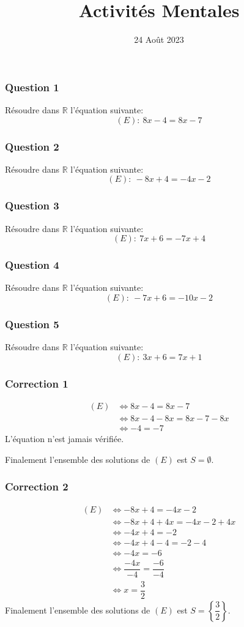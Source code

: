 \documentclass[15pt, mathserif]{beamer}
\title{Activités Mentales}
\date{24 Août 2023}
\begin{document}
\begin{frame}
    \titlepage
\end{frame}

\begin{frame} 
	\frametitle{Question 1}
	Résoudre dans $\mathbb{R}$ l'équation suivante: \[(E):~ 8x-4=8x-7\]\end{frame}


\begin{frame} 
	\frametitle{Question 2}
	Résoudre dans $\mathbb{R}$ l'équation suivante: \[(E):~ -8x+4=-4x-2\]\end{frame}


\begin{frame} 
	\frametitle{Question 3}
	Résoudre dans $\mathbb{R}$ l'équation suivante: \[(E):~ 7x+6=-7x+4\]\end{frame}


\begin{frame} 
	\frametitle{Question 4}
	Résoudre dans $\mathbb{R}$ l'équation suivante: \[(E):~ -7x+6=-10x-2\]\end{frame}


\begin{frame} 
	\frametitle{Question 5}
	Résoudre dans $\mathbb{R}$ l'équation suivante: \[(E):~ 3x+6=7x+1\]\end{frame}


\begin{frame}
\vspace{-10mm}
	\frametitle{Correction 1}
	\begin{align*} (E)& \Leftrightarrow 8x-4=8x-7\\
		&\Leftrightarrow 8x-4-8x=8x-7-8x\\
		&\Leftrightarrow -4=-7
	\end{align*}
	L'équation n'est jamais vérifiée.

Finalement l'ensemble des solutions de $(E)$ est $S = \emptyset$.
\end{frame}


\begin{frame}
\vspace{-10mm}
	\frametitle{Correction 2}
	\begin{align*} (E)& \Leftrightarrow -8x+4=-4x-2\\
		&\Leftrightarrow -8x+4+4x=-4x-2+4x\\
		&\Leftrightarrow -4x+4=-2\\
		&\Leftrightarrow -4x+4-4=-2-4\\
		&\Leftrightarrow -4x=-6\\
		&\Leftrightarrow \dfrac{-4x}{-4}=\dfrac{-6}{-4} \\
		&\Leftrightarrow x= \dfrac{3}{2}
	\end{align*}
	Finalement l'ensemble des solutions de $(E)$ est $S = \left\{\dfrac{3}{2}\right\}$.
\end{frame}
\end{document}
